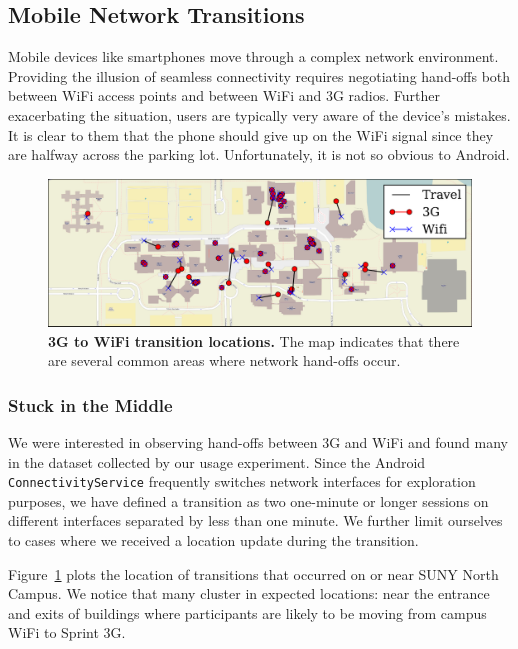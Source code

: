 \subsection{Mobile Network Transitions}
\label{subsec-networktransitions}

Mobile devices like smartphones move through a complex network environment.
Providing the illusion of seamless connectivity requires negotiating hand-offs
both between WiFi access points and between WiFi and 3G radios. Further
exacerbating the situation, users are typically very aware of the device's
mistakes. It is clear to them that the phone should give up on the WiFi
signal since they are halfway across the parking lot. Unfortunately, it is
not so obvious to Android.

\begin{figure}[t]
\includegraphics[width=\textwidth]{./figures/networking/transition_locations/graph.pdf}
\caption{\textbf{3G to WiFi transition locations.} The map indicates that
there are several common areas where network hand-offs occur.}
\label{figure-networktransitions}
\end{figure}

\subsubsection{Stuck in the Middle}

We were interested in observing hand-offs between 3G and WiFi and found many
in the dataset collected by our usage experiment. Since the Android
\texttt{ConnectivityService} frequently switches network interfaces for
exploration purposes, we have defined a transition as two one-minute or
longer sessions on different interfaces separated by less than one minute. We
further limit ourselves to cases where we received a location update during
the transition.

Figure~\ref{figure-networktransitions} plots the location of transitions that
occurred on or near SUNY North Campus. We notice that many cluster in
expected locations: near the entrance and exits of buildings where
participants are likely to be moving from campus WiFi to Sprint 3G.

